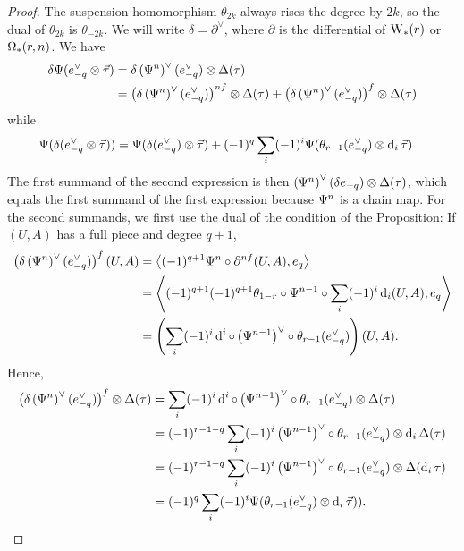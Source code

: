 \begin{proof}
The suspension homomorphism $\theta_{2k}$ always rises the degree by $2k$, so the dual of $\theta_{2k}$ is $\theta_{-2k}$. We will write $\delta = \partial^\vee$, where $\partial$ is the differential of $\operatorname{W}_{*}(r)$ or $\operatorname{\Omega}_{*}(r,n)$. We have
\begin{align*}
	\delta \Psi(e_{-q}^\vee\otimes \vec{\tau}) 
		&= \delta \left(\Psi^n\right)^{\vee}(e_{-q}^\vee)\otimes \Delta(\tau)\\
		&= \left(\delta\left(\Psi^n\right)^{\vee}(e_{-q}^\vee)\right)^{nf}\otimes\Delta(\tau) + \left(\delta\left(\Psi^n\right)^{\vee}(e_{-q}^\vee)\right)^{f}\otimes\Delta(\tau)
\end{align*}
while
\begin{align*}
	\Psi(\delta(e_{-q}^\vee\otimes \vec{\tau})) 
		&=\Psi(\delta(e_{-q}^\vee)\otimes \vec{\tau}) + (-1)^{q} \sum_i (-1)^{i} \Psi(\theta_{r-1}(e_{-q}^\vee)\otimes \operatorname{d}_i \vec{\tau})
	\end{align*}
The first summand of the second expression is then $\left(\Psi^n\right)^\vee(\delta e_{-q})\otimes \Delta(\tau)$, which equals the first summand of the first expression because $\Psi^{n}$ is a chain map. For the second summands, we first use the dual of the condition of the Proposition: If $(U,A)$ has a full piece and degree $q+1$,
\begin{align*}
	\left(\delta\left(\Psi^n\right)^\vee (e_{-q}^\vee)\right)^{f}(U,A) 
	&= \left\langle (-1)^{q+1}\Psi^n\circ \partial^{nf}(U,A),e_{q}\right\rangle 
	\\
	&= \left\langle (-1)^{q+1}(-1)^{q+1}\theta_{1-r}\circ \Psi^{n-1}\circ \sum_i (-1)^i \operatorname{d}_i(U,A),e_q\right\rangle
	\\
	&= \left(\sum_i (-1)^i\operatorname{d}^i\circ \left(\Psi^{n-1}\right)^{\vee}\circ \theta_{r-1}(e_{-q}^\vee)\right)(U,A).
\end{align*}
Hence,
\begin{align*}
	\left(\delta\left(\Psi^n\right)^{\vee}(e_{-q}^\vee)\right)^{f}\otimes\Delta(\tau)
		&= \sum_i (-1)^i \operatorname{d}^i\circ \left(\Psi^{n-1}\right)^\vee\circ \theta_{r-1} (e_{-q}^\vee)\otimes\Delta(\tau) 
		\\
		&=(-1)^{r-1-q}\sum_i (-1)^i\left(\Psi^{n-1}\right)^\vee \circ \theta_{r-1} (e_{-q}^\vee)\otimes \operatorname{d}_i\Delta(\tau) 
		\\
		&= (-1)^{r-1-q}\sum_i (-1)^i\left(\Psi^{n-1}\right)^\vee \circ \theta_{r-1} (e_{-q}^\vee)\otimes \Delta(\operatorname{d}_i\tau)
		\\
	&= (-1)^q\sum_i (-1)^{i} \Psi(\theta_{r-1}(e_{-q}^\vee)\otimes \operatorname{d}_i \vec{\tau})).\qedhere
\end{align*}
\end{proof}

